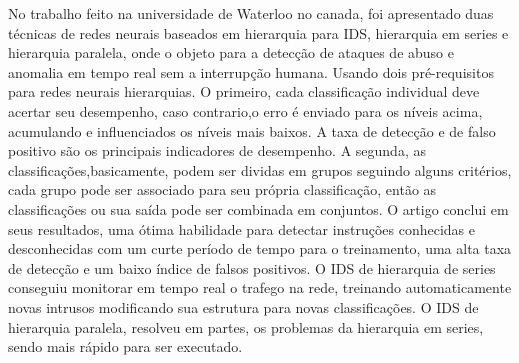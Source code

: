 No trabalho feito na universidade de Waterloo no canada\cite{Chunlin}, foi apresentado duas técnicas de redes neurais baseados em hierarquia para IDS, hierarquia em series e hierarquia paralela, onde o objeto para a detecção de ataques de abuso e anomalia em tempo real sem a interrupção humana.
Usando dois pré-requisitos para redes neurais hierarquias. O primeiro, cada classificação individual deve acertar seu desempenho, caso contrario,o erro é enviado para os níveis acima, acumulando e influenciados os níveis mais baixos. A taxa de detecção e de falso positivo são os principais indicadores de desempenho. 
A segunda, as classificações,basicamente, podem ser dividas em grupos seguindo alguns critérios, cada grupo pode ser associado para seu própria classificação, então as classificações ou sua saída pode ser combinada em conjuntos.
O artigo conclui em seus resultados, uma ótima habilidade para detectar instruções conhecidas e desconhecidas com um curte período de tempo para o treinamento, uma alta taxa de detecção e um baixo índice de falsos positivos.
O IDS de hierarquia de series conseguiu monitorar em tempo real o trafego na rede, treinando automaticamente novas intrusos modificando sua estrutura para novas classificações. O IDS de hierarquia paralela, resolveu em partes, os problemas da hierarquia em series, sendo mais rápido para ser executado.